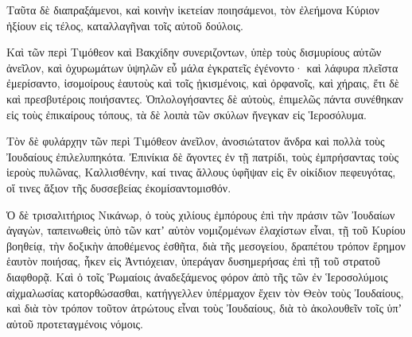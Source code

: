 {Ταῦτα δὲ διαπραξάμενοι, καὶ κοινὴν ἱκετείαν ποιησάμενοι, τὸν ἐλεήμονα Κύριον ἠξίουν εἰς τέλος, καταλλαγῆναι τοῖς αὐτοῦ δούλοις.
\par }{\PP {}Καὶ τῶν περὶ Τιμόθεον καὶ Βακχίδην συνεριζοντων, ὑπὲρ τοὺς δισμυρίους αὐτῶν ἀνεῖλον, καὶ ὀχυρωμάτων ὑψηλῶν εὖ μάλα ἐγκρατεῖς ἐγένοντο· καὶ λάφυρα πλεῖστα ἐμερίσαντο, ἰσομοίρους ἑαυτοὺς καὶ τοῖς ᾐκισμένοις, καὶ ὀρφανοῖς, καὶ χήραις, ἔτι δὲ καὶ πρεσβυτέροις ποιήσαντες.
Ὁπλολογήσαντες δὲ αὐτοὺς, ἐπιμελῶς πάντα συνέθηκαν εἰς τοὺς ἐπικαίρους τόπους, τὰ δὲ λοιπὰ τῶν σκύλων ἤνεγκαν εἰς Ἱεροσόλυμα.
\par }{\PP {}Τὸν δὲ φυλάρχην τῶν περὶ Τιμόθεον ἀνεῖλον, ἀνοσιώτατον ἄνδρα καὶ πολλὰ τοὺς Ἰουδαίους ἐπιλελυπηκότα.
Ἐπινίκια δὲ ἄγοντες ἐν τῇ πατρίδι, τοὺς ἐμπρήσαντας τοὺς ἱεροὺς πυλῶνας, Καλλισθένην, καί τινας ἄλλους ὑφῆψαν εἰς ἓν οἰκίδιον πεφευγότας, οἵ τινες ἄξιον τῆς δυσσεβείας ἐκομίσαντομισθόν.
\par }{\PP {}Ὁ δὲ τρισαλιτήριος Νικάνωρ, ὁ τοὺς χιλίους ἐμπόρους ἐπὶ τὴν πράσιν τῶν Ἰουδαίων ἀγαγὼν,
ταπεινωθεὶς ὑπὸ τῶν κατʼ αὑτὸν νομιζομένων ἐλαχίστων εἶναι, τῇ τοῦ Κυρίου βοηθείᾳ, τὴν δοξικὴν ἀποθέμενος ἐσθῆτα, διὰ τῆς μεσογείου, δραπέτου τρόπον ἔρημον ἑαυτὸν ποιήσας, ἧκεν εἰς Ἀντιόχειαν, ὑπεράγαν δυσημερήσας ἐπὶ τῇ τοῦ στρατοῦ διαφθορᾷ.
Καὶ ὁ τοῖς Ῥωμαίοις ἀναδεξάμενος φόρον ἀπὸ τῆς τῶν ἐν Ἱεροσολύμοις αἰχμαλωσίας κατορθώσασθαι, κατήγγελλεν ὑπέρμαχον ἔχειν τὸν Θεὸν τοὺς Ἰουδαίους, καὶ διὰ τὸν τρόπον τοῦτον ἀτρώτους εἶναι τοὺς Ἰουδαίους, διὰ τὸ ἀκολουθεῖν τοῖς ὑπʼ αὐτοῦ προτεταγμένοις νόμοις.

}
